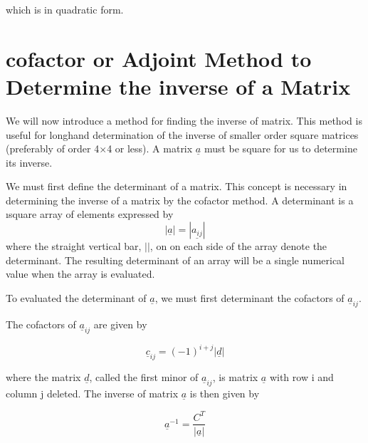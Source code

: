\documentclass[12pt]{report}
\begin{document}
which is in quadratic form.


\section{ cofactor or Adjoint Method to Determine the inverse of a Matrix}

We will now introduce a method for finding the inverse of matrix. This
method is useful for longhand determination of the inverse of smaller
order square matrices (preferably of order 4$\times$4 or less). A
matrix $\underline{a}$ must be square for us to determine its inverse.


We must first define the determinant of a matrix. This concept is
necessary in determining the inverse of a matrix by the cofactor
method. A determinant is a \i{square array of elements expressed by}
$$ |\underline {a}| = |\underline{a_{ij}}|$$
where the straight vertical bar, $| |$, on on each side of the array denote
the determinant. The resulting determinant of an array will be a
single numerical value when the array is evaluated.

To evaluated the determinant of $\underline{a}$, we must first determinant the
cofactors of $\underline{a}_{ij}$.

The cofactors of $\underline{a}_{ij}$ are given by

$$\underline{c}_{ij}=(-1)^{i+j} |\underline{d}|$$


where the matrix $\underline{d}$, called the first minor of $\underline{a}_{ij}$, is
matrix $\underline{a}$ with row i and column j deleted. The inverse of matrix
$\underline{a}$ is then given by


$$\underline{a}^{-1}=\frac{C^{T}}{|\underline{a}|}$$
\end{document}
